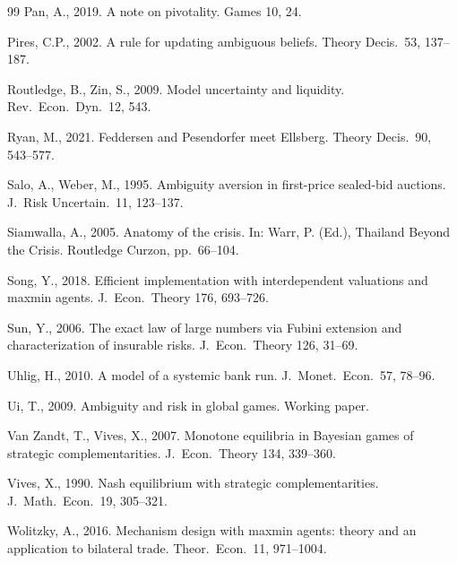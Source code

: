 \documentclass[12pt,a4paper]{article}
\theoremstyle{definition}
\theoremstyle{remark}
\begin{document}
\begin{thebibliography}{99}
Pan, A., 2019. A note on pivotality. Games 10, 24.

Pires, C.P., 2002. A rule for updating ambiguous beliefs. Theory Decis.\ 53, 137--187.

Routledge, B., Zin, S., 2009. Model uncertainty and liquidity. Rev.\ Econ.\ Dyn.\ 12, 543.

Ryan, M., 2021. Feddersen and Pesendorfer meet Ellsberg. Theory Decis.\ 90, 543--577.

Salo, A., Weber, M., 1995. Ambiguity aversion in first-price sealed-bid auctions. J.\ Risk Uncertain.\ 11, 123--137.

Siamwalla, A., 2005. Anatomy of the crisis. In: Warr, P. (Ed.), Thailand Beyond the Crisis. Routledge Curzon, pp.\ 66--104.

Song, Y., 2018. Efficient implementation with interdependent valuations and maxmin agents. J.\ Econ.\ Theory 176, 693--726.

Sun, Y., 2006. The exact law of large numbers via Fubini extension and characterization of insurable risks. J.\ Econ.\ Theory 126, 31--69.

Uhlig, H., 2010. A model of a systemic bank run. J.\ Monet.\ Econ.\ 57, 78--96.

Ui, T., 2009. Ambiguity and risk in global games. Working paper.

Van Zandt, T., Vives, X., 2007. Monotone equilibria in Bayesian games of strategic complementarities. J.\ Econ.\ Theory 134, 339--360.

Vives, X., 1990. Nash equilibrium with strategic complementarities. J.\ Math.\ Econ.\ 19, 305--321.

Wolitzky, A., 2016. Mechanism design with maxmin agents: theory and an application to bilateral trade. Theor.\ Econ.\ 11, 971--1004.

\end{thebibliography}
\end{document}
